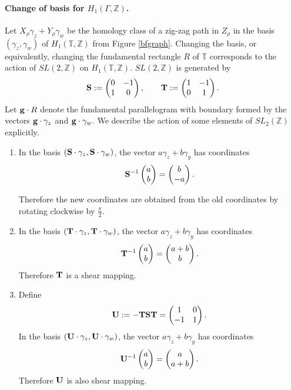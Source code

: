 \documentclass[11pt]{article} %
\theoremstyle{definition}
\newcommand{\Z}{{\mathbb Z}}
\newcommand{\T}{{\mathbb T}}
\begin{document}
\paragraph{Change of basis for $H_1(\Gamma,\Z)$.}
Let $X_\rho \gamma_z + Y_\rho \gamma_w$ be the homology class of a zig-zag path in $Z_\rho$ in the basis $(\gamma_z,\gamma_w)$ of $H_1(\T,\Z)$ from Figure \ref{bfgraph}. Changing the basis, or equivalently, changing the fundamental rectangle $R$ of $\T$ corresponds to the action of $SL(2,\Z)$ on $H_1(\T,\Z)$. 
$SL(2,\Z)$ is generated by 
$$
{\bf S}:=\begin{pmatrix}0&-1\\1&0 \end{pmatrix}, \qquad   {\bf T}:=\begin{pmatrix}1&-1\\0&1 \end{pmatrix}.$$ 
Let ${\bf g}\cdot R$ denote the fundamental parallelogram with boundary formed by the vectors ${\bf g} \cdot \gamma_z$ and ${\bf g}\cdot \gamma_w$. We describe the action of some elements of $SL_2(\Z)$ explicitly.
\begin{enumerate}
    \item In the basis $({\bf S}\cdot \gamma_z, {\bf S}\cdot \gamma_w)$, the vector $a \gamma_z + b \gamma_y$ has coordinates
    $$
    {\bf S}^{-1}\begin{pmatrix}a\\b \end{pmatrix}=\begin{pmatrix}b\\-a \end{pmatrix}.
    $$
    
    Therefore the new coordinates are obtained from the old coordinates by rotating clockwise by $\frac{\pi}2$.
    
    \item In the basis $({\bf T}\cdot \gamma_z, {\bf T}\cdot \gamma_w)$, the vector $a \gamma_z + b \gamma_y$ has coordinates
    $$
    {\bf T}^{-1}\begin{pmatrix}a\\b \end{pmatrix}=\begin{pmatrix}a+b\\b \end{pmatrix}.
    $$
    Therefore ${\bf T}$ is a shear mapping.
    
    \item Define 
    $${\bf U}:=-{\bf T}{\bf S} {\bf T}=\begin{pmatrix}1&0\\-1&1 \end{pmatrix}.$$
    In the basis $({\bf U}\cdot \gamma_z, {\bf U}\cdot \gamma_w)$, the vector $a \gamma_z + b \gamma_y$ has coordinates
    $$
    {\bf U}^{-1}\begin{pmatrix}a\\b \end{pmatrix}=\begin{pmatrix}a\\a+b \end{pmatrix}.
    $$
    Therefore ${\bf U}$ is also shear mapping.
\end{enumerate}
\end{document}
